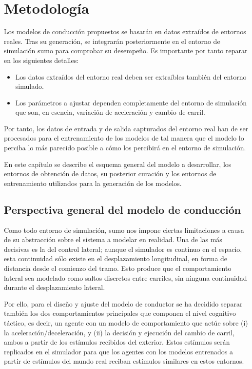 \chapter{Metodología}
\label{ch:methodology}

Los modelos de conducción propuestos se basarán en datos extraídos de entornos reales. Tras su generación, se integrarán posteriormente en el entorno de simulación \gls{sumo} para comprobar su desempeño. Es importante por tanto reparar en los siguientes detalles:

\begin{itemize}
	\item Los datos extraídos del entorno real deben ser extraíbles también del entorno simulado. 
	\item Los parámetros a ajustar dependen completamente del entorno de simulación que son, en esencia, variación de aceleración y cambio de carril.
\end{itemize}

Por tanto, los datos de entrada y de salida capturados del entorno real han de ser procesados para el entrenamiento de los modelos de tal manera que el modelo lo perciba lo más parecido posible a cómo los percibirá en el entorno de simulación.

En este capítulo se describe el esquema general del modelo a desarrollar, los entornos de obtención de datos, su posterior curación y los entornos de entrenamiento utilizados para la generación de los modelos.

\section{Perspectiva general del modelo de conducción}

Como todo entorno de simulación, \gls{sumo} nos impone ciertas limitaciones a causa de su abstracción sobre el sistema a modelar en realidad. Una de las más decisivas es la del control lateral; aunque el simulador es continuo en el espacio, esta continuidad sólo existe en el desplazamiento longitudinal, en forma de distancia desde el comienzo del tramo. Esto produce que el comportamiento lateral sea modelado como saltos discretos entre carriles, sin ninguna continuidad durante el desplazamiento lateral.

Por ello, para el diseño y ajuste del modelo de conductor se ha decidido separar también los dos comportamientos principales que componen el nivel cognitivo táctico, es decir, un agente con un modelo de comportamiento que actúe sobre (i) la aceleración/deceleración, y (ii) la decisión y ejecución del cambio de carril, ambos a partir de los estímulos recibidos del exterior. Estos estímulos serán replicados en el simulador para que los agentes con los modelos entrenados a partir de estímulos del mundo real reciban estímulos similares en estos entornos.


